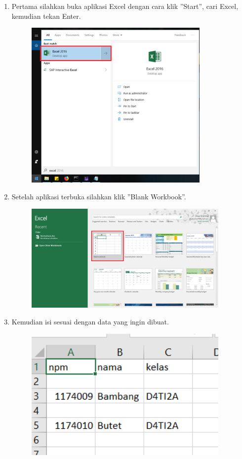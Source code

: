 \begin{enumerate}
	\item Pertama silahkan buka aplikasi Excel dengan cara klik ''Start'', cari Excel, kemudian tekan Enter.
	
	\begin{figure}[H]
		\includegraphics[width=9cm]{figures/4/1174089/Teori/t1.png}
		\centering
	\end{figure}
	
	\item Setelah aplikasi terbuka silahkan klik ''Blank Workbook''.
	
	\begin{figure}[H]
		\includegraphics[width=10cm]{figures/4/1174089/Teori/t2.png}
		\centering
	\end{figure}
	
	\item Kemudian isi sesuai dengan data yang ingin dibuat.
	
	\begin{figure}[H]
		\includegraphics[width=10cm]{figures/4/1174089/Teori/t3.png}
		\centering
	\end{figure}
	

\end{enumerate}
